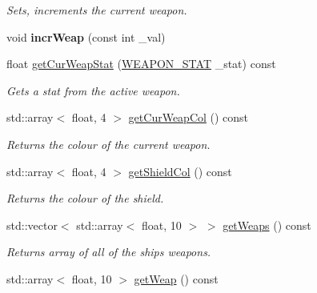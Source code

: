 \begin{DoxyCompactItemize}
\begin{DoxyCompactList}\small\item\em Sets, increments the current weapon. \end{DoxyCompactList}\item 
\hypertarget{classship_a8cac59509b65e0aadcb30bd7206b6bbd}{void {\bfseries incr\-Weap} (const int \-\_\-val)}\label{classship_a8cac59509b65e0aadcb30bd7206b6bbd}

\item 
float \hyperlink{classship_a3376905d6b8e5428e9afb4c89d4b8ebb}{get\-Cur\-Weap\-Stat} (\hyperlink{weapons_8hpp_ac6523c0263d02b0fbdbe8b8e958a50b5}{W\-E\-A\-P\-O\-N\-\_\-\-S\-T\-A\-T} \-\_\-stat) const 
\begin{DoxyCompactList}\small\item\em Gets a stat from the active weapon. \end{DoxyCompactList}\item 
\hypertarget{classship_af49c18fa918ff3597b6adeef15c0483c}{std\-::array$<$ float, 4 $>$ \hyperlink{classship_af49c18fa918ff3597b6adeef15c0483c}{get\-Cur\-Weap\-Col} () const }\label{classship_af49c18fa918ff3597b6adeef15c0483c}

\begin{DoxyCompactList}\small\item\em Returns the colour of the current weapon. \end{DoxyCompactList}\item 
\hypertarget{classship_af33e5cfaec7c0ac036ecd1ca52d654a8}{std\-::array$<$ float, 4 $>$ \hyperlink{classship_af33e5cfaec7c0ac036ecd1ca52d654a8}{get\-Shield\-Col} () const }\label{classship_af33e5cfaec7c0ac036ecd1ca52d654a8}

\begin{DoxyCompactList}\small\item\em Returns the colour of the shield. \end{DoxyCompactList}\item 
\hypertarget{classship_aa8603eb9b3e23120b61c76379510a23f}{std\-::vector$<$ std\-::array$<$ float, 10 $>$ $>$ \hyperlink{classship_aa8603eb9b3e23120b61c76379510a23f}{get\-Weaps} () const }\label{classship_aa8603eb9b3e23120b61c76379510a23f}

\begin{DoxyCompactList}\small\item\em Returns array of all of the ships weapons. \end{DoxyCompactList}\item 
\hypertarget{classship_a30fc891ce056dab197aa2738a7c100aa}{std\-::array$<$ float, 10 $>$ \hyperlink{classship_a30fc891ce056dab197aa2738a7c100aa}{get\-Weap} () const }\label{classship_a30fc891ce056dab197aa2738a7c100aa}


\end{DoxyCompactItemize}
